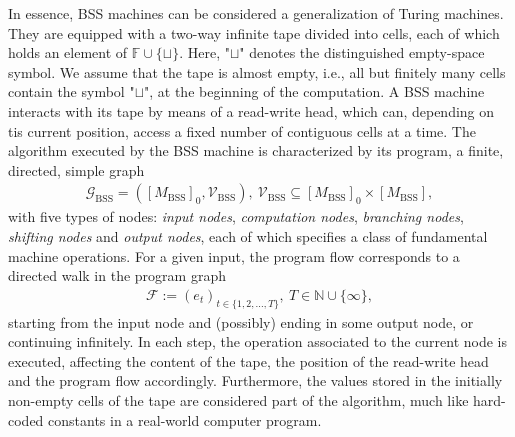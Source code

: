 \documentclass[conference]{IEEEtran}
\def\G{{\mathcal G}}
\def\V{{\mathcal V}}
\def\F{{\mathcal F}}
\def\NN{{\mathbb N}}
\def\FF{{\mathbb F}}
\newcommand{\BSS}{\mathrm{BSS}}
\begin{document}
	In essence, BSS machines can be considered a generalization of Turing machines. They are equipped with a two-way infinite tape divided into cells, each of which holds an 
	element of \(\FF\cup\{\sqcup\}\). Here, "\(\sqcup\)" denotes the distinguished empty-space symbol. We assume that the tape is almost empty, i.e., all but finitely many cells 
	contain the symbol "\(\sqcup\)", at the beginning of the computation. A BSS machine interacts with its tape by means of a read-write head, which can, depending on tis current 
	position, access a fixed number of contiguous cells at a time. The algorithm executed by the BSS machine is characterized by its program, a finite, directed, simple graph 
	\begin{align*}   \G_\BSS = ([M_\BSS]_{0}, \V_\BSS),~ \V_\BSS \subseteq [M_\BSS]_{0} \times [M_\BSS],
	\end{align*} 
	with five types of nodes: \emph{input nodes}, \emph{computation nodes}, \emph{branching nodes}, \emph{shifting nodes} and \emph{output nodes}, each of which specifies a class 
	of fundamental machine operations. For a given input, the program flow corresponds to a directed walk in the program graph
	\begin{align*}	\F := (e_t)_{t\in\{1,2,\ldots,T\}},~T\in\NN\cup \{\infty\},
	\end{align*}
	starting from the input node and (possibly) ending in some output node, or continuing infinitely. In each step, the operation associated to the current node is executed, 
	affecting the content of the tape, the position of the read-write head and the program flow accordingly. Furthermore, the values stored in the initially non-empty cells 
	of the tape are considered part of the algorithm, much like hard-coded constants in a real-world computer program. 
\end{document}

